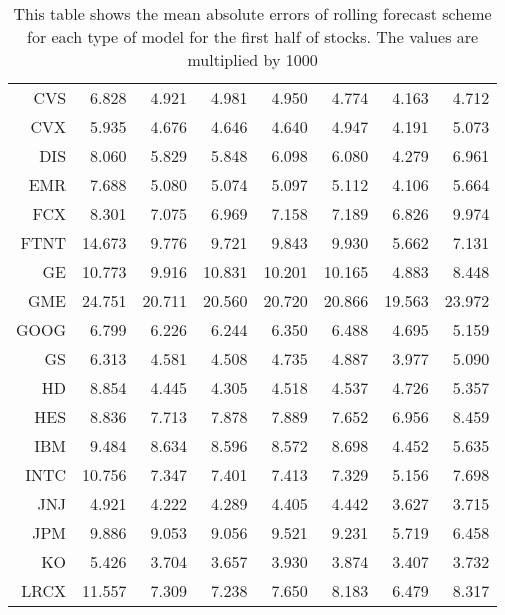 \begin{table}[ht]
\begin{tabular}{rrrrrrrr}
  CVS & 6.828 & 4.921 & 4.981 & 4.950 & 4.774 & 4.163 & 4.712 \\ 
  CVX & 5.935 & 4.676 & 4.646 & 4.640 & 4.947 & 4.191 & 5.073 \\ 
  DIS & 8.060 & 5.829 & 5.848 & 6.098 & 6.080 & 4.279 & 6.961 \\ 
  EMR & 7.688 & 5.080 & 5.074 & 5.097 & 5.112 & 4.106 & 5.664 \\ 
  FCX & 8.301 & 7.075 & 6.969 & 7.158 & 7.189 & 6.826 & 9.974 \\ 
  FTNT & 14.673 & 9.776 & 9.721 & 9.843 & 9.930 & 5.662 & 7.131 \\ 
  GE & 10.773 & 9.916 & 10.831 & 10.201 & 10.165 & 4.883 & 8.448 \\ 
  GME & 24.751 & 20.711 & 20.560 & 20.720 & 20.866 & 19.563 & 23.972 \\ 
  GOOG & 6.799 & 6.226 & 6.244 & 6.350 & 6.488 & 4.695 & 5.159 \\ 
  GS & 6.313 & 4.581 & 4.508 & 4.735 & 4.887 & 3.977 & 5.090 \\ 
  HD & 8.854 & 4.445 & 4.305 & 4.518 & 4.537 & 4.726 & 5.357 \\ 
  HES & 8.836 & 7.713 & 7.878 & 7.889 & 7.652 & 6.956 & 8.459 \\ 
  IBM & 9.484 & 8.634 & 8.596 & 8.572 & 8.698 & 4.452 & 5.635 \\ 
  INTC & 10.756 & 7.347 & 7.401 & 7.413 & 7.329 & 5.156 & 7.698 \\ 
  JNJ & 4.921 & 4.222 & 4.289 & 4.405 & 4.442 & 3.627 & 3.715 \\ 
  JPM & 9.886 & 9.053 & 9.056 & 9.521 & 9.231 & 5.719 & 6.458 \\ 
  KO & 5.426 & 3.704 & 3.657 & 3.930 & 3.874 & 3.407 & 3.732 \\ 
  LRCX & 11.557 & 7.309 & 7.238 & 7.650 & 8.183 & 6.479 & 8.317 \\ 
   \hline
\end{tabular}
\caption[MAE rolling forecast (1)]{This table shows the mean absolute errors of rolling forecast scheme for each type of model for the first half of stocks. 
                     The values are multiplied by 1000} 
\label{Table:MAE_r_1}
\end{table}
